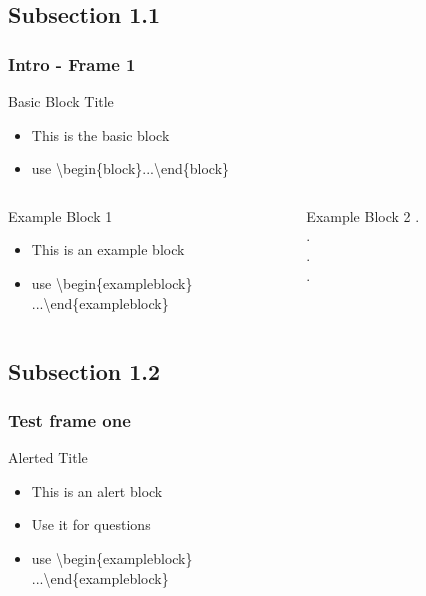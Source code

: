 \documentclass[10pt,compress]{beamer}
\begin{document}
\subsection{Subsection 1.1}
\begin{frame}\frametitle{Intro - Frame 1} 
\begin{block}{Basic Block Title}
\begin{itemize}
 \item This is the basic block
\item use \textbackslash begin\{block\}...\textbackslash end\{block\}
\end{itemize}
\end{block}
\pause
\begin{columns}
\begin{column}{5cm}
\begin{exampleblock}{Example Block 1}
\begin{itemize}
 \item This is an example block
\item use \textbackslash begin\{exampleblock\}\\ ...\textbackslash end\{exampleblock\}
\end{itemize}
\end{exampleblock}
\pause
\end{column}
\begin{column}{5cm}
\begin{exampleblock}{Example Block 2}
.\\
.\\
.\\
.\\
\end{exampleblock}
\end{column}
\end{columns}
\end{frame}

\subsection{Subsection 1.2}
\begin{frame}\frametitle{Test frame one}
\begin{alertblock}{Alerted Title}
\begin{itemize}
 \item This is an alert block
 \item Use it for questions
\item use \textbackslash begin\{exampleblock\}\\ ...\textbackslash end\{exampleblock\}
\end{itemize}
\end{alertblock}
\end{frame}
\end{document}
